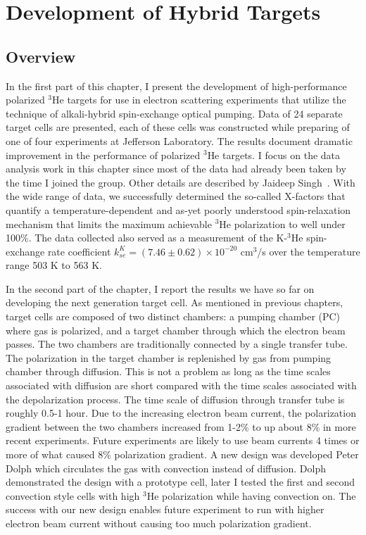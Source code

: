 \chapter{Development of Hybrid Targets}
\label{chap4}

\section{Overview}

In the first part of this chapter, I present the development of high-performance polarized $^{3}$He targets for use in electron scattering experiments that utilize the technique of alkali-hybrid spin-exchange optical pumping. Data of 24 separate target cells are presented, each of these cells was constructed while preparing of one of four experiments at Jefferson Laboratory. The results document dramatic improvement in the performance of polarized $^{3}$He targets. I focus on the data analysis work in this chapter since most of the data had already been taken by the time I joined the group. Other details are described by Jaideep Singh~\cite{PhysRevC.91.055205}. With the wide range of data, we successfully determined the so-called X-factors that quantify a temperature-dependent and as-yet poorly understood spin-relaxation mechanism that limits the maximum achievable $^{3}$He polarization to well under 100\%. The data collected also served as a measurement of the K-$^{3}$He spin-exchange rate coefficient $k_{se}^{K}=(7.46\pm0.62)\times10^{-20}$ cm$^{3}$/s over the temperature range 503 K to 563 K.

In the second part of the chapter, I report the results we have so far on developing the next generation target cell. As mentioned in previous chapters, target cells are composed of two distinct chambers: a pumping chamber (PC) where gas is polarized, and a target chamber through which the electron beam passes. The two chambers are traditionally connected by a single transfer tube. The polarization in the target chamber is replenished by gas from pumping chamber through diffusion. This is not a problem as long as the time scales associated with diffusion are short compared with the time scales associated with the depolarization process. The time scale of diffusion through transfer tube is roughly 0.5-1 hour. Due to the increasing electron beam current, the polarization gradient between the two chambers increased from 1-2\% to up about 8\% in more recent experiments. Future experiments are likely to use beam currents 4 times or more of what caused 8\% polarization gradient. A new design was developed Peter Dolph which circulates the gas with convection instead of diffusion. Dolph demonstrated the design with a prototype cell, later I tested the first and second convection style cells with high $^{3}$He polarization while having convection on. The success with our new design enables future experiment to run with higher electron beam current without causing too much polarization gradient.

